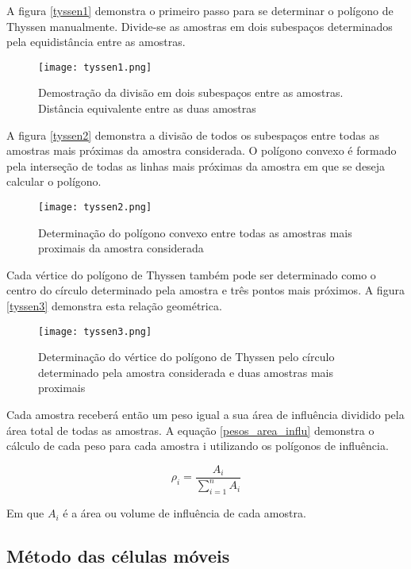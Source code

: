  A figura \eqref{tyssen1} demonstra o primeiro passo para se determinar o polígono de Thyssen manualmente. Divide-se as amostras em dois subespaços determinados pela equidistância entre as amostras.
 
\begin{figure}[H]
 	\centering
 	\texttt{[image: tyssen1.png]}	
 	\caption{Demostração da divisão em dois subespaços entre as amostras. Distância equivalente entre as duas amostras }
 	\label{tyssen1}
\end{figure}

A figura \eqref{tyssen2} demonstra a divisão de todos os subespaços entre todas as amostras mais próximas da amostra considerada. O polígono convexo é formado pela interseção de todas as linhas mais próximas da amostra em que se deseja calcular o polígono. 

\begin{figure}[H]
  	\centering
  	\texttt{[image: tyssen2.png]}	
  	\caption{Determinação do polígono convexo entre todas as amostras mais proximais da amostra considerada}
  	\label{tyssen2}
\end{figure}
 
 Cada vértice do polígono de Thyssen também pode ser determinado como o centro do círculo determinado pela amostra e três pontos mais próximos. A figura \eqref{tyssen3} demonstra esta relação geométrica. 
 
 \begin{figure}[H]
 	\centering
 	\texttt{[image: tyssen3.png]}	
 	\caption{Determinação do vértice do polígono de Thyssen pelo círculo determinado pela amostra considerada e duas amostras mais proximais}
 	\label{tyssen3}
 \end{figure}
 
 Cada amostra receberá então um peso igual a sua área de influência dividido pela área total de todas as amostras. A equação \eqref{pesos_area_influ} demonstra o cálculo de cada peso para cada amostra i utilizando os polígonos de influência.
 
  \begin{equation}\label{pesos_area_influ}
  \rho _{i} = \frac{A_{i}}{\sum_{i=1}^{n}A_{i}}
  \end{equation}
  
  Em que $A_{i}$ é a área ou volume de influência de cada amostra.
 
  \subsection{Método das células móveis }
  
